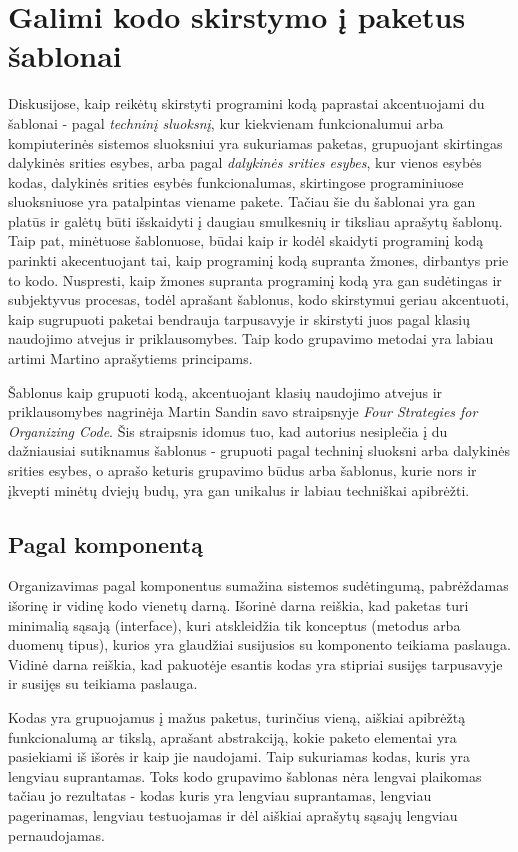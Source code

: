 \section{Galimi kodo skirstymo į paketus šablonai}
Diskusijose, kaip reikėtų skirstyti programini kodą paprastai akcentuojami du šablonai - pagal \textit{techninį sluoksnį},
kur kiekvienam funkcionalumui arba kompiuterinės sistemos sluoksniui yra sukuriamas paketas,
grupuojant skirtingas dalykinės srities esybes, arba pagal \textit{dalykinės srities esybes}, kur vienos esybės kodas, dalykinės srities
esybės funkcionalumas, skirtingose programiniuose sluoksniuose yra patalpintas viename pakete.
Tačiau šie du šablonai yra gan platūs ir galėtų būti išskaidyti į daugiau smulkesnių ir tiksliau aprašytų šablonų.
Taip pat, minėtuose šablonuose, būdai kaip ir kodėl skaidyti programinį kodą parinkti akecentuojant tai, kaip programinį
kodą supranta žmones, dirbantys prie to kodo.
Nuspresti, kaip žmones supranta programinį kodą yra gan sudėtingas ir subjektyvus procesas, todėl aprašant šablonus, kodo skirstymui
geriau akcentuoti, kaip sugrupuoti paketai bendrauja tarpusavyje ir skirstyti juos pagal klasių naudojimo atvejus ir priklausomybes.
Taip kodo grupavimo metodai yra labiau artimi Martino aprašytiems principams.


Šablonus kaip grupuoti kodą, akcentuojant klasių naudojimo atvejus ir priklausomybes nagrinėja Martin Sandin savo
straipsnyje \textit{Four Strategies for Organizing Code}.
Šis straipsnis idomus tuo, kad autorius nesiplečia į du dažniausiai sutiknamus šablonus - grupuoti pagal techninį sluoksni arba dalykinės srities esybes,
o aprašo keturis grupavimo būdus arba šablonus, kurie nors ir įkvepti minėtų dviejų budų, yra gan unikalus ir labiau techniškai apibrėžti.
\subsection{Pagal komponentą}
Organizavimas pagal komponentus sumažina sistemos sudėtingumą, pabrėždamas išorinę ir vidinę kodo vienetų darną.
Išorinė darna reiškia, kad paketas turi minimalią sąsają \angl(interface), kuri atskleidžia tik konceptus (metodus arba duomenų tipus),
kurios yra glaudžiai susijusios su komponento teikiama paslauga.
Vidinė darna reiškia, kad pakuotėje esantis kodas yra stipriai susijęs tarpusavyje ir susijęs su teikiama paslauga.

Kodas yra grupuojamus į mažus paketus, turinčius vieną, aiškiai apibrėžtą funkcionalumą ar tikslą, aprašant abstrakciją, kokie paketo elementai
yra pasiekiami iš išorės ir kaip jie naudojami.
Taip sukuriamas kodas, kuris yra lengviau suprantamas.
Toks kodo grupavimo šablonas nėra lengvai plaikomas tačiau jo rezultatas - kodas kuris yra lengviau suprantamas, lengviau pagerinamas, lengviau testuojamas
ir dėl aiškiai aprašytų sąsajų lengviau pernaudojamas.

